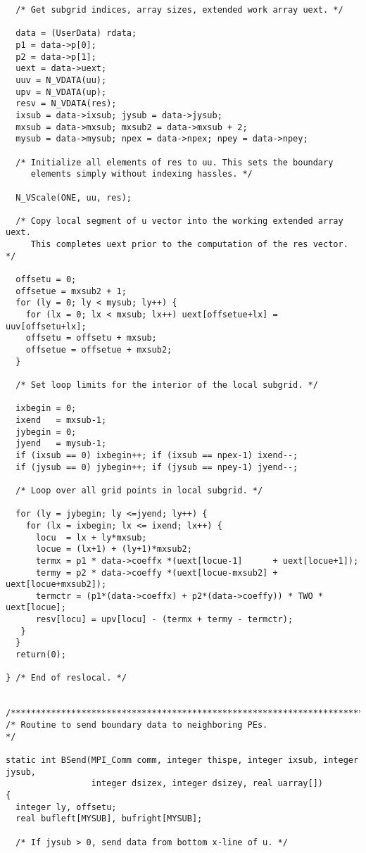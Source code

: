 \begin{verbatim}
  /* Get subgrid indices, array sizes, extended work array uext. */

  data = (UserData) rdata;
  p1 = data->p[0];
  p2 = data->p[1];
  uext = data->uext;
  uuv = N_VDATA(uu);
  upv = N_VDATA(up);
  resv = N_VDATA(res);
  ixsub = data->ixsub; jysub = data->jysub;
  mxsub = data->mxsub; mxsub2 = data->mxsub + 2;
  mysub = data->mysub; npex = data->npex; npey = data->npey;

  /* Initialize all elements of res to uu. This sets the boundary
     elements simply without indexing hassles. */

  N_VScale(ONE, uu, res);

  /* Copy local segment of u vector into the working extended array uext.
     This completes uext prior to the computation of the res vector.     */

  offsetu = 0;
  offsetue = mxsub2 + 1;
  for (ly = 0; ly < mysub; ly++) {
    for (lx = 0; lx < mxsub; lx++) uext[offsetue+lx] = uuv[offsetu+lx];
    offsetu = offsetu + mxsub;
    offsetue = offsetue + mxsub2;
  }

  /* Set loop limits for the interior of the local subgrid. */

  ixbegin = 0;
  ixend   = mxsub-1;
  jybegin = 0;
  jyend   = mysub-1;
  if (ixsub == 0) ixbegin++; if (ixsub == npex-1) ixend--;
  if (jysub == 0) jybegin++; if (jysub == npey-1) jyend--;
  
  /* Loop over all grid points in local subgrid. */

  for (ly = jybegin; ly <=jyend; ly++) {
    for (lx = ixbegin; lx <= ixend; lx++) {
      locu  = lx + ly*mxsub;
      locue = (lx+1) + (ly+1)*mxsub2;
      termx = p1 * data->coeffx *(uext[locue-1]      + uext[locue+1]);
      termy = p2 * data->coeffy *(uext[locue-mxsub2] + uext[locue+mxsub2]);
      termctr = (p1*(data->coeffx) + p2*(data->coeffy)) * TWO * uext[locue];
      resv[locu] = upv[locu] - (termx + termy - termctr);
   }
  }
  return(0);

} /* End of reslocal. */


/*************************************************************************/
/* Routine to send boundary data to neighboring PEs.                     */

static int BSend(MPI_Comm comm, integer thispe, integer ixsub, integer jysub,
                 integer dsizex, integer dsizey, real uarray[])
{
  integer ly, offsetu;
  real bufleft[MYSUB], bufright[MYSUB];

  /* If jysub > 0, send data from bottom x-line of u. */


\end{verbatim}
